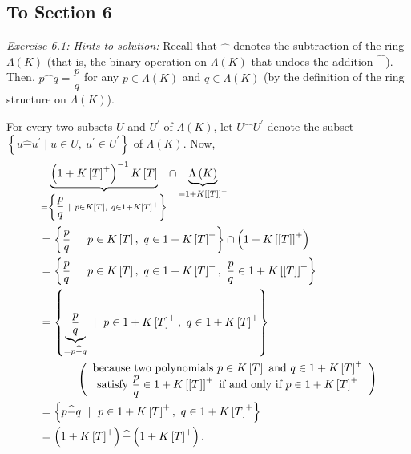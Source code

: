 \documentclass[numbers=enddot,12pt,final,onecolumn,notitlepage]{scrartcl}%
\begin{document}
\subsection{To Section 6}

\textit{Exercise 6.1: Hints to solution:} Recall that $\widehat{-}$ denotes
the subtraction of the ring $\Lambda\left(  K\right)  $ (that is, the binary
operation on $\Lambda\left(  K\right)  $ that undoes the addition
$\widehat{+}$). Then, $p\widehat{-}q=\dfrac{p}{q}$ for any $p\in\Lambda\left(
K\right)  $ and $q\in\Lambda\left(  K\right)  $ (by the definition of the ring
structure on $\Lambda\left(  K\right)  $).

For every two subsets $U$ and $U^{\prime}$ of $\Lambda\left(  K\right)  $, let
$U\widehat{-}U^{\prime}$ denote the subset $\left\{  u\widehat{-}u^{\prime
}\mid u\in U,\ u^{\prime}\in U^{\prime}\right\}  $ of $\Lambda\left(
K\right)  $. Now,%
\begin{align*}
&  \underbrace{\left(  1+K\left[  T\right]  ^{+}\right)  ^{-1}K\left[
T\right]  }_{=\left\{  \dfrac{p}{q}\ \mid\ p\in K\left[  T\right]
,\ q\in1+K\left[  T\right]  ^{+}\right\}  }\cap\underbrace{\Lambda\left(
K\right)  }_{=1+K\left[  \left[  T\right]  \right]  ^{+}}\\
&  =\left\{  \dfrac{p}{q}\ \mid\ p\in K\left[  T\right]  ,\ q\in1+K\left[
T\right]  ^{+}\right\}  \cap\left(  1+K\left[  \left[  T\right]  \right]
^{+}\right) \\
&  =\left\{  \dfrac{p}{q}\ \mid\ p\in K\left[  T\right]  ,\ q\in1+K\left[
T\right]  ^{+},\ \dfrac{p}{q}\in1+K\left[  \left[  T\right]  \right]
^{+}\right\} \\
&  =\left\{  \underbrace{\dfrac{p}{q}}_{=p\widehat{-}q}\ \mid\ p\in1+K\left[
T\right]  ^{+},\ q\in1+K\left[  T\right]  ^{+}\right\} \\
&  \ \ \ \ \ \ \ \ \ \ \left(
\begin{array}
[c]{c}%
\text{because two polynomials }p\in K\left[  T\right]  \text{ and }%
q\in1+K\left[  T\right]  ^{+}\\
\text{satisfy }\dfrac{p}{q}\in1+K\left[  \left[  T\right]  \right]  ^{+}\text{
if and only if }p\in1+K\left[  T\right]  ^{+}%
\end{array}
\right) \\
&  =\left\{  p\widehat{-}q\ \mid\ p\in1+K\left[  T\right]  ^{+},\ q\in
1+K\left[  T\right]  ^{+}\right\} \\
&  =\left(  1+K\left[  T\right]  ^{+}\right)  \widehat{-}\left(  1+K\left[
T\right]  ^{+}\right)  .
\end{align*}
\end{document}
